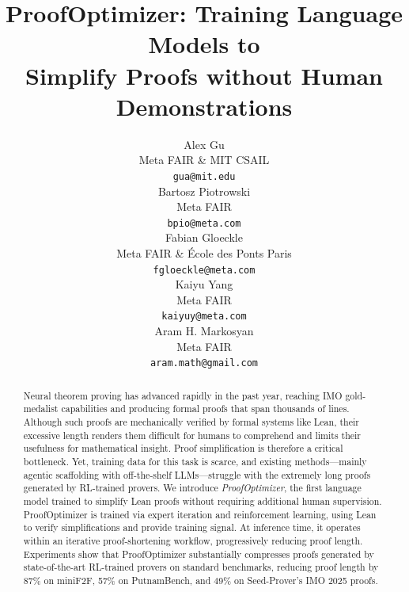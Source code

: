 \documentclass{article}
\title{ProofOptimizer: Training Language Models to \\Simplify Proofs without Human Demonstrations}
\author{%
  Alex Gu \\
  Meta FAIR \& MIT CSAIL \\
  \texttt{gua@mit.edu} \\
  \And
  Bartosz Piotrowski\\
  Meta FAIR\\
  \texttt{bpio@meta.com} \\
  \And
  Fabian Gloeckle \\
  Meta FAIR \& École des Ponts Paris \\
  \texttt{fgloeckle@meta.com} \\
  \And
  Kaiyu Yang\\
  Meta FAIR \\
  \texttt{kaiyuy@meta.com} \\
  \And
  Aram H. Markosyan \\
  Meta FAIR \\
  \texttt{aram.math@gmail.com} \\
}
\begin{document}
\maketitle

\begin{abstract}
Neural theorem proving has advanced rapidly in the past year, reaching IMO gold-medalist capabilities and producing formal proofs that span thousands of lines. Although such proofs are mechanically verified by formal systems like Lean, their excessive length renders them difficult for humans to comprehend and limits their usefulness for mathematical insight. Proof simplification is therefore a critical bottleneck. Yet, training data for this task is scarce, and existing methods---mainly agentic scaffolding with off-the-shelf LLMs---struggle with the extremely long proofs generated by RL-trained provers. We introduce \emph{ProofOptimizer}, the first language model trained to simplify Lean proofs without requiring additional human supervision. ProofOptimizer is trained via expert iteration and reinforcement learning, using Lean to verify simplifications and provide training signal. At inference time, it operates within an iterative proof-shortening workflow, progressively reducing proof length. Experiments show that ProofOptimizer substantially compresses proofs generated by state-of-the-art RL-trained provers on standard benchmarks, reducing proof length by 87\% on miniF2F, 57\% on PutnamBench, and 49\% on Seed-Prover's IMO 2025 proofs.
\end{abstract}







% 

\newpage



\raggedbottom
\appendix

\end{document}
